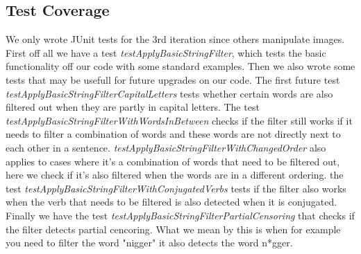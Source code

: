 \subsection{Test Coverage}
We only wrote JUnit tests for the 3rd iteration since others manipulate images.
First off all we have a test \textit{testApplyBasicStringFilter}, which tests the basic functionality off our code with some standard examples. 
Then we also wrote some tests that may be usefull for future upgrades on our code.
The first future test \textit{testApplyBasicStringFilterCapitalLetters} tests whether certain words 
are also filtered out when they are partly in capital letters. 
The test \textit{testApplyBasicStringFilterWithWordsInBetween} checks if the filter still works if 
it needs to filter a combination of words and these words are not directly next to each other in a sentence.
\textit{testApplyBasicStringFilterWithChangedOrder} also applies to cases where it's a combination of
words that need to be filtered out, here we check if it's also filtered when the words are in a different 
ordering.
the test \textit{testApplyBasicStringFilterWithConjugatedVerbs} tests if the filter also works when the 
verb that needs to be filtered is also detected when it is conjugated.
Finally we have the test \textit{testApplyBasicStringFilterPartialCensoring} that checks if the filter detects 
partial cencoring. What we mean by this is when for example you need to filter the word "nigger" it also
detects the word n*gger.
